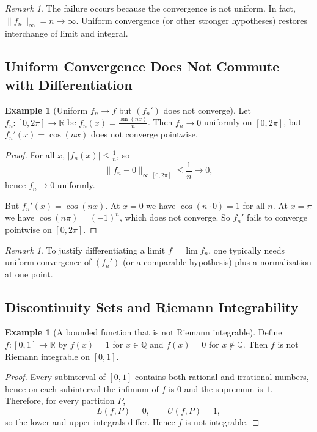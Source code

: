 \documentclass[12pt]{article}
\numberwithin{equation}{section}
\def\abs#1{|#1|}
\newcommand{\RR}{\mathbb{R}}
\newcommand{\QQ}{\mathbb{Q}}
\DeclarePairedDelimiter{\abs}{\lvert}{\rvert}
\theoremstyle{plain}
\theoremstyle{definition}
\newtheorem{example}[theorem]{Example}
\theoremstyle{remark}
\newtheorem{remark}[theorem]{Remark}
\begin{document}
\begin{remark}
The failure occurs because the convergence is not uniform.  In fact, $\|f_n\|_\infty=n\to\infty$.
Uniform convergence (or other stronger hypotheses) restores interchange of limit and integral.
\end{remark}

\subsection{Uniform Convergence Does Not Commute with Differentiation}

\begin{example}[Uniform $f_n\to f$ but $(f_n')$ does not converge]\label{ex:app_sin}
Let $f_n:[0,2\pi]\to\RR$ be $f_n(x)=\frac{\sin(nx)}{n}$.
Then $f_n\to 0$ uniformly on $[0,2\pi]$, but $f_n'(x)=\cos(nx)$ does not converge pointwise.
\end{example}

\begin{proof}
For all $x$, $\abs{f_n(x)}\le \frac{1}{n}$, so
\[
\|f_n-0\|_{\infty,[0,2\pi]}\le \frac{1}{n}\to 0,
\]
hence $f_n\to 0$ uniformly.

But $f_n'(x)=\cos(nx)$.
At $x=0$ we have $\cos(n\cdot 0)=1$ for all $n$.
At $x=\pi$ we have $\cos(n\pi)=(-1)^n$, which does not converge.
So $f_n'$ fails to converge pointwise on $[0,2\pi]$.
\end{proof}

\begin{remark}
To justify differentiating a limit $f=\lim f_n$, one typically needs uniform convergence of $(f_n')$
(or a comparable hypothesis) plus a normalization at one point.
\end{remark}

\subsection{Discontinuity Sets and Riemann Integrability}

\begin{example}[A bounded function that is not Riemann integrable]\label{ex:app_dirichlet}
Define $f:[0,1]\to\RR$ by $f(x)=1$ for $x\in\QQ$ and $f(x)=0$ for $x\notin\QQ$.
Then $f$ is not Riemann integrable on $[0,1]$.
\end{example}

\begin{proof}
Every subinterval of $[0,1]$ contains both rational and irrational numbers, hence on each subinterval
the infimum of $f$ is $0$ and the supremum is $1$.
Therefore, for every partition $P$,
\[
L(f,P)=0,\qquad U(f,P)=1,
\]
so the lower and upper integrals differ. Hence $f$ is not integrable.
\end{proof}
\end{document}
